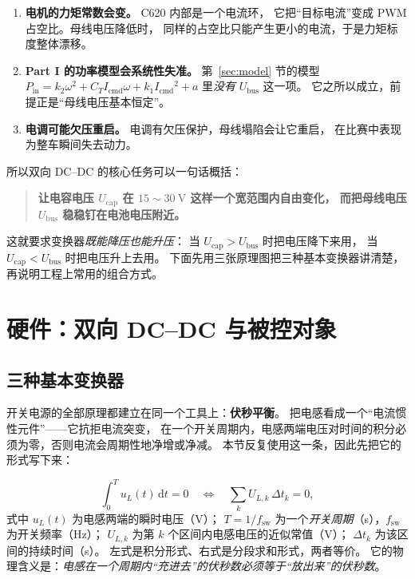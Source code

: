 \documentclass[cn,blue,11pt,device=normal]{elegantnote}
\newcommand{\Pin}{P_{\mathrm{in}}{}}
\newcommand{\Icmd}{I_{\mathrm{cmd}}{}}
\newcommand{\CT}{C_{T}{}}
\newcommand{\dd}{\mathrm{d}}
\begin{document}
\begin{enumerate}
  \item \textbf{电机的力矩常数会变。} C620 内部是一个电流环，
  它把“目标电流”变成 PWM 占空比。母线电压降低时，
  同样的占空比只能产生更小的电流，于是力矩标度整体漂移。
  \item \textbf{Part I 的功率模型会系统性失准。} 第~\ref{sec:model} 节的模型
  $\Pin=k_2\omega^2+\CT\Icmd\omega+k_1\Icmd^2+a$ 里\emph{没有} $U_{\mathrm{bus}}$ 这一项。
  它之所以成立，前提正是“母线电压基本恒定”。
  \item \textbf{电调可能欠压重启。} 电调有欠压保护，母线塌陷会让它重启，
  在比赛中表现为整车瞬间失去动力。
\end{enumerate}

所以双向 DC--DC 的核心任务可以一句话概括：

\begin{quote}
\textbf{让电容电压 $U_{\mathrm{cap}}$ 在 $15\sim30\ \mathrm{V}$ 这样一个宽范围内自由变化，
而把母线电压 $U_{\mathrm{bus}}$ 稳稳钉在电池电压附近。}
\end{quote}

这就要求变换器\emph{既能降压也能升压}：
当 $U_{\mathrm{cap}}>U_{\mathrm{bus}}$ 时把电压降下来用，
当 $U_{\mathrm{cap}}<U_{\mathrm{bus}}$ 时把电压升上去用。
下面先用三张原理图把三种基本变换器讲清楚，再说明工程上常用的组合方式。

\section{硬件：双向 DC--DC 与被控对象}\label{sec:schw}

\subsection{三种基本变换器}

开关电源的全部原理都建立在同一个工具上：\textbf{伏秒平衡}。
把电感看成一个“电流惯性元件”——它抗拒电流突变，
在一个开关周期内，电感两端电压对时间的积分必须为零，否则电流会周期性地净增或净减。
本节反复使用这一条，因此先把它的形式写下来：

\begin{equation}\label{eq:voltsecond}
  \int_{0}^{T} u_L(t)\,\dd t = 0
  \quad\Longleftrightarrow\quad
  \sum_{k} U_{L,k}\,\Delta t_k = 0 ,
\end{equation}
式中 $u_L(t)$ 为电感两端的瞬时电压（V）；
$T=1/f_{\mathrm{sw}}$ 为一个\emph{开关周期}（s），$f_{\mathrm{sw}}$ 为开关频率（Hz）；
$U_{L,k}$ 为第 $k$ 个区间内电感电压的近似常值（V）；
$\Delta t_k$ 为该区间的持续时间（s）。
左式是积分形式、右式是分段求和形式，两者等价。
它的物理含义是：\emph{电感在一个周期内“充进去”的伏秒数必须等于“放出来”的伏秒数}。
\end{document}
